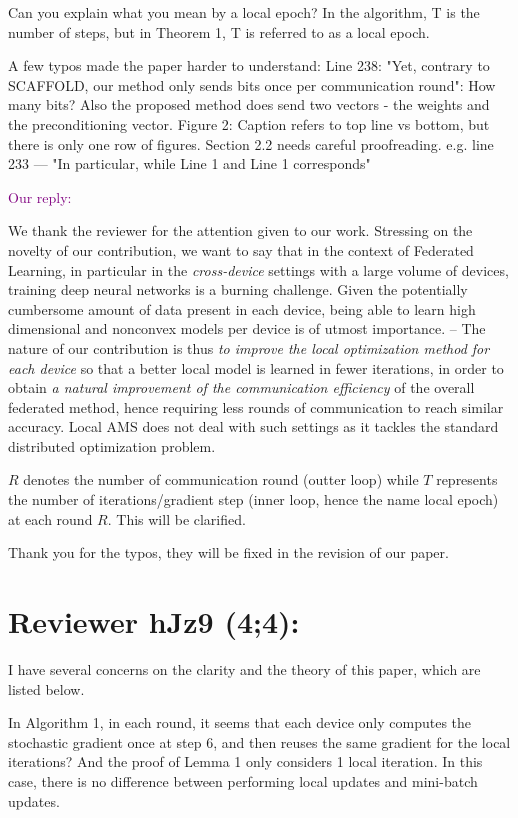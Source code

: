 \documentclass{article}
\begin{document}
Can you explain what you mean by a local epoch? In the algorithm, T is the number of steps, but in Theorem 1, T is referred to as a local epoch.

A few typos made the paper harder to understand: Line 238: "Yet, contrary to SCAFFOLD, our method only sends bits once per communication round": How many bits? Also the proposed method does send two vectors - the weights and the preconditioning vector. Figure 2: Caption refers to top line vs bottom, but there is only one row of figures. Section 2.2 needs careful proofreading. e.g. line 233 --- "In particular, while Line 1 and Line 1 corresponds"


\textcolor{purple}{Our reply:}

We thank the reviewer for the attention given to our work.
Stressing on the novelty of our contribution, we want to say that in the context of Federated Learning, in particular in the \emph{cross-device} settings with a large volume of devices, training deep neural networks is a burning challenge.
Given the potentially cumbersome amount of data present in each device, being able to learn high dimensional and nonconvex models per device is of utmost importance.
-- The nature of our contribution is thus \emph{to improve the local optimization method for each device} so that a better local model is learned in fewer iterations, in order to obtain \emph{a natural improvement of the communication efficiency} of the overall federated method, hence requiring less rounds of communication to reach similar accuracy.
Local AMS does not deal with such settings as it tackles the standard distributed optimization problem.

$R$ denotes the number of communication round (outter loop) while $T$ represents the number of iterations/gradient step (inner loop, hence the name local epoch) at each round $R$. This will be clarified.

Thank you for the typos, they will be fixed in the revision of our paper.


\section{Reviewer hJz9 (4;4):}

I have several concerns on the clarity and the theory of this paper, which are listed below.

In Algorithm 1, in each round, it seems that each device only computes the stochastic gradient once at step 6, and then reuses the same gradient for the  local iterations? And the proof of Lemma 1 only considers 1 local iteration. In this case, there is no difference between performing local updates and mini-batch updates.
\end{document}
